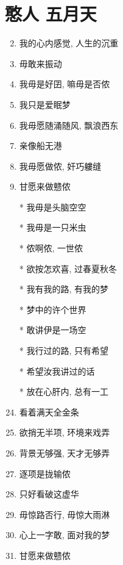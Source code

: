 \documentclass[UTF8]{ctexart}
\begin{document}
    \section*{憨人 \of 五月天}

    \begin{center}
        \begin{enumerate}

            \item[] 
            \item 我的心内感觉, 人生的沉重
            \item 毋敢来振动
            \item 我毋是好囝, 嘛毋是否侬
            \item 我只是爱眠梦
            \item 我毋愿随涌随风, 飘浪西东
            \item 亲像船无港
            \item 我毋愿做侬, 奸巧軁缝
            \item 甘愿来做戆侬

            \item[]
            \item[] \chorus
            \item[*] 我毋是头脑空空
            \item[*] 我毋是一只米虫
            \item[*] 侬啊侬, 一世侬
            \item[*] 欲按怎欢喜, 过春夏秋冬
            \item[*] 我有我的路, 有我的梦
            \item[*] 梦中的许个世界
            \item[*] 敢讲伊是一场空
            \item[*] 我行过的路, 只有希望
            \item[*] 希望汝我讲过的话
            \item[*] 放在心肝内, 总有一工

            \item[]
            \item[] 
            \item 看着满天全金条
            \item 欲捎无半项, 环境来戏弄
            \item 背景无够强, 天才无够弄
            \item 逐项是拢输侬
            \item 只好看破这虚华
            \item 毋惊路否行, 毋惊大雨淋
            \item 心上一字敢, 面对我的梦
            \item 甘愿来做戆侬
            

\end{enumerate}
\end{center}
\end{document}
